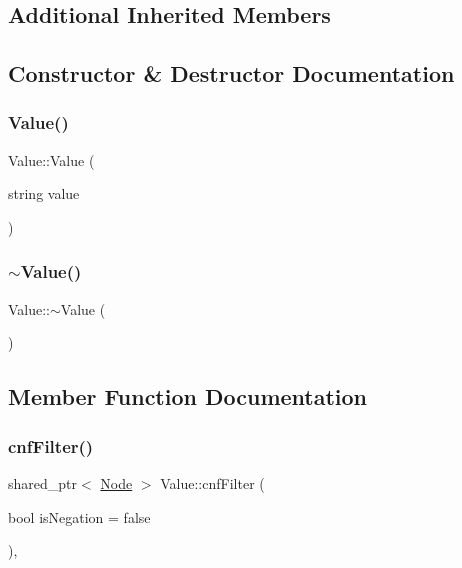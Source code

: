 \subsection*{Additional Inherited Members}


\subsection{Constructor \& Destructor Documentation}
\mbox{\label{class_value_a98e1dd185ea30f4e9343de03008fd622}} 
\subsubsection{\texorpdfstring{Value()}{Value()}}
{\footnotesize\ttfamily Value\+::\+Value (\begin{DoxyParamCaption}\item[{string}]{value }\end{DoxyParamCaption})\hspace{0.3cm}{\ttfamily [explicit]}}

\mbox{\label{class_value_a73578eb3c2fa9af8c62f836d1a3b0063}} 
\subsubsection{\texorpdfstring{$\sim$\+Value()}{~Value()}}
{\footnotesize\ttfamily Value\+::$\sim$\+Value (\begin{DoxyParamCaption}{ }\end{DoxyParamCaption})\hspace{0.3cm}{\ttfamily [override]}}



\subsection{Member Function Documentation}
\mbox{\label{class_value_a56c458de6a68b9a25233e6fdcfa67760}} 
\subsubsection{\texorpdfstring{cnf\+Filter()}{cnfFilter()}}
{\footnotesize\ttfamily shared\+\_\+ptr$<$ \hyperlink{class_node}{Node} $>$ Value\+::cnf\+Filter (\begin{DoxyParamCaption}\item[{bool}]{is\+Negation = {\ttfamily false} }\end{DoxyParamCaption})\hspace{0.3cm}{\ttfamily [override]}, {\ttfamily [virtual]}}



